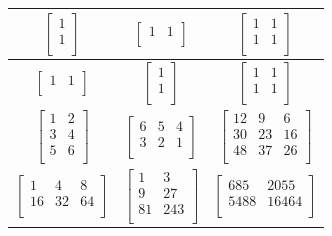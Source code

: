 \documentclass[a4paper,14pt]{report}
\begin{document}
\begin{table}[h!]
\begin{tabular}{|c | c | c |}
		$\begin{bmatrix}
		1 \\
		1 \\
		\end{bmatrix}$ &
		$\begin{bmatrix}
		1 & 1 \\
		\end{bmatrix}$ &
		$\begin{bmatrix}
		1 & 1 \\
		1 & 1 \\
		\end{bmatrix}$ \\
		\hline

		$\begin{bmatrix}
		1 & 1\\
		\end{bmatrix}$ &
		$\begin{bmatrix}
		1 \\
		1 \\
		\end{bmatrix}$ &
		$\begin{bmatrix}
		1 & 1 \\
		1 & 1 \\
		\end{bmatrix}$ \\
		\hline

		$\begin{bmatrix}
		1 & 2 \\
		3 & 4 \\
		5 & 6 \\
		\end{bmatrix}$ &
		$\begin{bmatrix}
		6 & 5 & 4 \\
		3 & 2 & 1\\
		\end{bmatrix}$ &
		$\begin{bmatrix}
		12 & 9 & 6 \\
		30 & 23 & 16 \\
		48 & 37 & 26 \\
		\end{bmatrix}$ \\
		\hline

		$\begin{bmatrix}
		1 & 4 & 8 \\
		16 & 32 & 64 \\
		\end{bmatrix}$ &
		$\begin{bmatrix}
		1 & 3 \\
		9 & 27 \\
		81 & 243 \\
		\end{bmatrix}$ &
		$\begin{bmatrix}
		685 & 2055 \\
		5488 & 16464 \\
		\end{bmatrix}$ \\
		\hline


\end{tabular}
\end{table}
\end{document}
